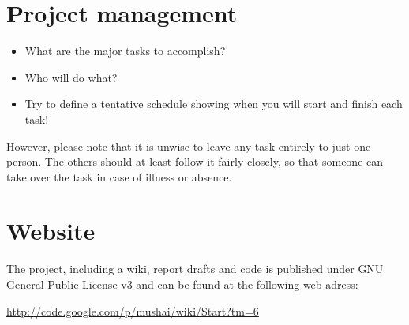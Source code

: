 \documentclass[times, 10pt,twocolumn]{article}
\begin{document}
\section{Project management}
\begin{itemize}
	\item{What are the major tasks to accomplish?}
	\item{Who will do what?}
	\item{Try to define a tentative schedule showing when you will start and finish each task!}
\end{itemize}
However, please note that it is unwise to leave any task entirely to just one person. The others should at least follow it fairly closely, so that someone can take over the task in case of illness or absence.

\section{Website}
The project, including a wiki, report drafts and code is published under GNU General Public License v3 and can be found at the following web adress:

\url{http://code.google.com/p/mushai/wiki/Start?tm=6}

\nocite{games_solved,course_book}


\end{document}
